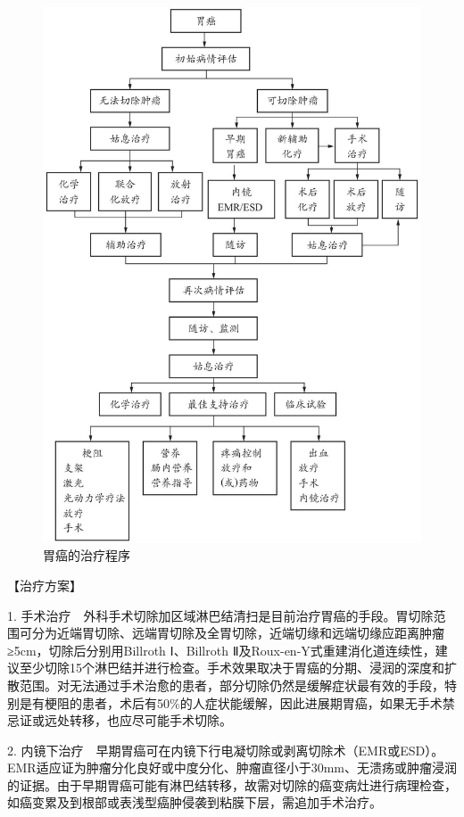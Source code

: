 \begin{figure}[!htbp]
 \centering
 \includegraphics{./images/Image00089.jpg}
 \captionsetup{justification=centering}
 \caption{胃癌的治疗程序}
 \label{fig3-4-1}
  \end{figure} 

【治疗方案】

1.
手术治疗　外科手术切除加区域淋巴结清扫是目前治疗胃癌的手段。胃切除范围可分为近端胃切除、远端胃切除及全胃切除，近端切缘和远端切缘应距离肿瘤≥5cm，切除后分别用Billroth
Ⅰ、Billroth
Ⅱ及Roux-en-Y式重建消化道连续性，建议至少切除15个淋巴结并进行检查。手术效果取决于胃癌的分期、浸润的深度和扩散范围。对无法通过手术治愈的患者，部分切除仍然是缓解症状最有效的手段，特别是有梗阻的患者，术后有50\%的人症状能缓解，因此进展期胃癌，如果无手术禁忌证或远处转移，也应尽可能手术切除。

2.
内镜下治疗　早期胃癌可在内镜下行电凝切除或剥离切除术（EMR或ESD）。EMR适应证为肿瘤分化良好或中度分化、肿瘤直径小于30mm、无溃疡或肿瘤浸润的证据。由于早期胃癌可能有淋巴结转移，故需对切除的癌变病灶进行病理检查，如癌变累及到根部或表浅型癌肿侵袭到粘膜下层，需追加手术治疗。

